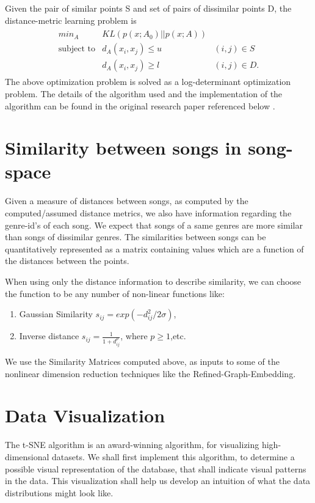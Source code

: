 \documentclass[12pt]{article}
\begin{document}
Given the pair of similar points S and set of pairs of dissimilar points D, the distance-metric learning problem is
\begin{align}
\begin{array}{ccc}
min_A &  KL(p(x;A_0)||p(x;A))& \\
\text{subject to} & d_A(x_i, x_j) \leq u & (i,j) \in S\\
 & d_A(x_i, x_j) \geq l & (i,j) \in D.
\end{array}
\end{align}
The above optimization problem is solved as a log-determinant optimization problem. The details of the algorithm used and the implementation of the algorithm can be found in the original research paper referenced below \cite{infoTheoryMetricLearning}.

\section{Similarity between songs in song-space}
Given a measure of distances between songs, as computed by the computed/assumed distance metrics, we also have information regarding the genre-id's of each song. We expect that songs of a same genres are more similar than songs of dissimilar genres. The similarities between songs can be quantitatively represented as a matrix containing values which are a function of the distances between the points. 

When using only the distance information to describe similarity, we can choose the function to be any number of non-linear functions like:
\begin{enumerate}
\item Gaussian Similarity $s_{ij} = exp(-d_{ij}^2 / 2\sigma)$,
\item Inverse distance $s_{ij} = \frac{1}{1 + d_{ij}^p}$, where $p \geq 1$,etc.
\end{enumerate}
We use the Similarity Matrices computed above, as inputs to some of the nonlinear dimension reduction techniques like the Refined-Graph-Embedding.

\section{Data Visualization}
The t-SNE algorithm \cite{tSNEdataViz} is an award-winning algorithm, for visualizing high-dimensional datasets. We shall first implement this algorithm, to determine a possible visual representation of the database, that shall indicate visual patterns in the data. This visualization shall help us develop an intuition of what the data distributions might look like. 
\end{document}

